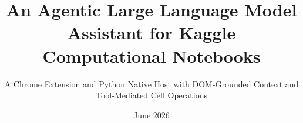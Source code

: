 \documentclass[11pt,a4paper,oneside]{book} %
\title{An Agentic Large Language Model Assistant for Kaggle Computational Notebooks}
\subtitle{A Chrome Extension and Python Native Host with DOM-Grounded Context and Tool-Mediated Cell Operations}
\date{June 2026}
\numberwithin{equation}{section}
\begin{document}
\maketitle









\tableofcontents
\listoftables
\listoffigures


\newpage



\resetpagenumbering

\end{document}
